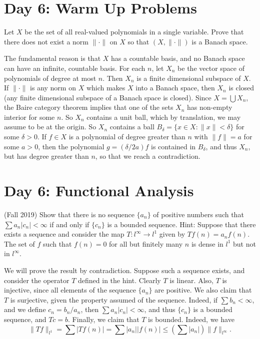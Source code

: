 \documentclass[answers]{exam}
\begin{document}
\begin{questions}
\begin{solution}
  
\end{solution}






\newpage
\section{Day 6: Warm Up Problems}

\question Let $X$ be the set of all real-valued polynomials in a single variable. Prove that there does not exist a norm $\| \cdot \|$ on $X$ so that $(X, \| \cdot \|)$ is a Banach space.
\begin{solution}
	The fundamental reason is that $X$ has a countable basis, and no Banach space can have an infinite, countable basis. For each $n$, let $X_n$ be the vector space of polynomials of degree at most $n$. Then $X_n$ is a finite dimensional subspace of $X$. If $\| \cdot \|$ is any norm on $X$ which makes $X$ into a Banach space, then $X_n$ is closed (any finite dimensional subspace of a Banach space is closed). Since $X = \bigcup X_n$, the Baire category theorem implies that one of the sets $X_n$ has non-empty interior for some $n$. So $X_n$ contains a unit ball, which by translation, we may assume to be at the origin. So $X_n$ contains a ball $B_\delta = \{ x \in X: \| x \| < \delta \}$ for some $\delta > 0$. If $f \in X$ is a polynomial of degree greater than $n$ with $\| f \| = a$ for some $a > 0$, then the polynomial $g = (\delta / 2 a) f$ is contained in $B_\delta$, and thus $X_n$, but has degree greater than $n$, so that we reach a contradiction.
\end{solution}




\newpage
\section{Day 6: Functional Analysis}

\question (Fall 2019) Show that there is no sequence $\{ a_n \}$ of positive numbers such that $\sum a_n |c_n| < \infty$ if and only if $\{ c_n \}$ is a bounded sequence. Hint: Suppose that there exists a sequence and consider the map $T: l^\infty \to l^1$ given by $Tf(n) = a_n f(n)$. The set of $f$ such that $f(n) = 0$ for all but finitely many $n$ is dense in $l^1$ but not in $l^\infty$.
\begin{solution}
	We will prove the result by contradiction. Suppose such a sequence exists, and consider the operator $T$ defined in the hint. Clearly $T$ is linear. Also, $T$ is injective, since all elements of the sequence $\{ a_n \}$ are positive. We also claim that $T$ is surjective, given the property assumed of the sequence. Indeed, if $\sum b_n < \infty$, and we define $c_n = b_n/a_n$, then $\sum a_n |c_n| < \infty$, and thus $\{ c_n \}$ is a bounded sequence, and $Tc = b$. Finally, we claim that $T$ is bounded. Indeed, we have
    \[ \| Tf \|_{l^1} = \sum |Tf(n)| = \sum |a_n| |f(n)| \leq \left( \sum |a_n| \right) \| f \|_{l^\infty}. \]
   

\end{solution}
\end{questions}
\end{document}
